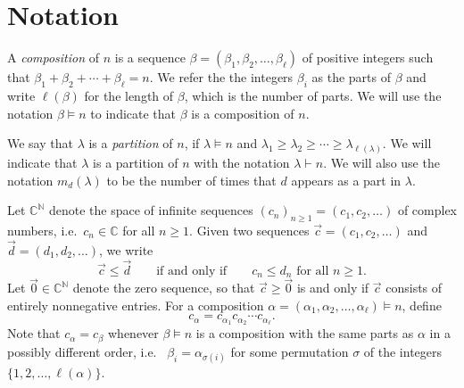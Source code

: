 \documentclass[11pt]{amsart}
\newcommand{\defncolor}{\color{darkred}}
\newcommand{\defn}[1]{{\defncolor\emph{#1}}} %
\theoremstyle{definition}
\numberwithin{equation}{section}
\def\NN{{\mathbb N}}
\def\CC{{\mathbb C}}
\begin{document}
\section{Notation}

A \defn{composition} of $n$ is a sequence $\beta = (\beta_1, \beta_2, \ldots, \beta_\ell)$ of positive integers such that $\beta_{1} + \beta_{2} + \cdots + \beta_{\ell} = n$.  
We refer the the integers $\beta_{i}$ as the parts of $\beta$ and write $\ell(\beta)$ for the length of $\beta$, which is the number of parts.  
We will use the notation $\beta \vDash n$ to indicate that $\beta$ is a composition of $n$.

We say that $\lambda$ is a \defn{partition} of $n$, if $\lambda \vDash n$ and
$\lambda_1 \geq \lambda_2 \geq \cdots \geq \lambda_{\ell(\lambda)}$.  We will indicate that $\lambda$ is a partition
of $n$ with the notation $\lambda \vdash n$.  We will also use the notation $m_d(\lambda)$ to be the number of times
that $d$ appears as a part in $\lambda$.

Let $\CC^{\NN}$ denote the space of infinite sequences $(c_{n})_{n \ge 1} = (c_{1}, c_{2}, \ldots)$ of complex numbers, i.e.~$c_{n} \in \CC$ for all $n \ge 1$.  
Given two sequences $\vec{c} = (c_{1}, c_{2}, \ldots)$ and $\vec{d} = (d_{1}, d_{2}, \ldots)$, we write
\[
\vec{c} \le \vec{d} 
\qquad\text{if and only if}\qquad
\text{$c_{n} \le d_{n}$ for all $n \ge 1$}.
\]
Let $\vec{0} \in \CC^{\NN}$ denote the zero sequence, so that $\vec{c} \ge \vec{0}$ is and only if $\vec{c}$ consists of entirely nonnegative entries.  
For a composition $\alpha = (\alpha_{1}, \alpha_{2}, \ldots, \alpha_{\ell}) \vDash n$, define 
\[
c_{\alpha} = c_{\alpha_{1}} c_{\alpha_{2}} \cdots c_{\alpha_{\ell}}.
\]
Note that $c_{\alpha} = c_{\beta}$ whenever $\beta \vDash n$ is a composition with the same parts as $\alpha$ in a possibly different order, i.e.~ $\beta_{i} = \alpha_{\sigma(i)}$ for some permutation $\sigma$ of the integers $\{1,2, \ldots, \ell(\alpha)\}$.


%
\end{document}
